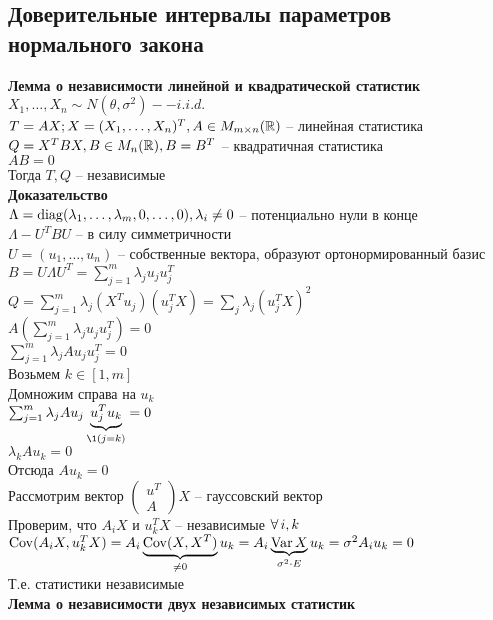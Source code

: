 \documentclass[12pt]{article}
\begin{document}
\subsection{Доверительные интервалы параметров нормального закона}
\textbf{Лемма о независимости линейной и квадратической статистик}\\
$X_1, \ldots, X_n \sim N(\theta, \sigma^2) -- i.i.d.$\\
$T=AX; X = (X_1, \ldots, X_n)^T, A \in M_{m\times n}(\Rset)$ -- линейная статистика\\
$Q = X^T B X, B \in M_n(\Rset), B = B^T$ -- квадратичная статистика\\
$AB = 0$\\
Тогда $T, Q$ -- независимые\\
\textbf{Доказательство}\\
$\Lambda = \nm{diag}(\lambda_1, \ldots, \lambda_m, 0, \ldots, 0), \lambda_i \neq 0$ -- потенциально нули в конце\\
$\Lambda - U^T BU$ -- в силу симметричности\\
$U = (u_1, \ldots, u_n)$ -- собственные вектора, образуют ортонормированный базис\\
$B = U\Lambda U^T = \sum_{j=1}^m \lambda_j u_j  u^T_j$\\
$Q = \sum_{j=1}^m \lambda_j (X^T u_j)  (u^T_j X) = \sum_j \lambda_j (u^T_j X)^2$\\
$A(\sum_{j=1}^m \lambda_j u_j  u^T_j) = 0$\\
$\sum_{j=1}^m \lambda_j A u_j  u^T_j = 0$\\
Возьмем $k \in [1, m]$\\
Домножим справа на $u_k$\\
$\sum_{j=1}^m \lambda_j A u_j  \ub{\1(j = k)}{u^T_j u_k} = 0$\\
$\lambda_k A u_k = 0$\\
Отсюда $A u_k = 0$\\
Рассмотрим вектор $\begin{pmatrix}
	u^T\\
	A
\end{pmatrix}X$ -- гауссовский вектор\\
Проверим, что $A_iX$ и $u^T_k X$ -- независимые $\fall i, k$\\
$\Cov (A_i X, u^T_k X) = A_i \ub{\neq 0}{\Cov (X, X^T)} u_k = A_i \ub{\sigma^2 \cdot E}{\Var X} u_k = \sigma^2 A_i u_k = 0$\\
Т.е. статистики независимые\\
\textbf{Лемма о независимости двух независимых статистик}\\
\end{document}

